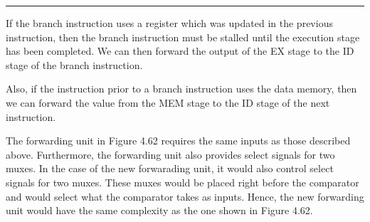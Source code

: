 \documentclass[11pt]{exam}
\newcounter{questionCounter}
\newcounter{partCounter}[questionCounter]
\newenvironment{namedquestion}[1]{%
    \addtocounter{questionCounter}{1}%
    \setcounter{partCounter}{0}%
    \vspace{.2in}%
        \noindent{\bf #1}%
    \vspace{0.3em} \hrule \vspace{.1in}%
}{}
\begin{document}
\begin{namedquestion}{Question 4.14.6}


If the branch instruction uses a register which was updated in the previous instruction, then the branch instruction must be stalled until the execution stage has been completed. We can then forward the output of the EX stage to the ID stage of the branch instruction.

Also, if the instruction prior to a branch instruction uses the data memory, then we can forward the value from the MEM stage to the ID stage of the next instruction. 

The forwarding unit in Figure 4.62 requires the same inputs as those described above. Furthermore, the forwarding unit also provides select signals for two muxes. In the case of the new forwarading unit, it would also control select signals for two muxes. These muxes would be placed right before the comparator and would select what the comparator takes as inputs. Hence, the new forwarding unit would have the same complexity as the one shown in Figure 4.62. 


    
\end{namedquestion}


\printbibliography
\end{document}
